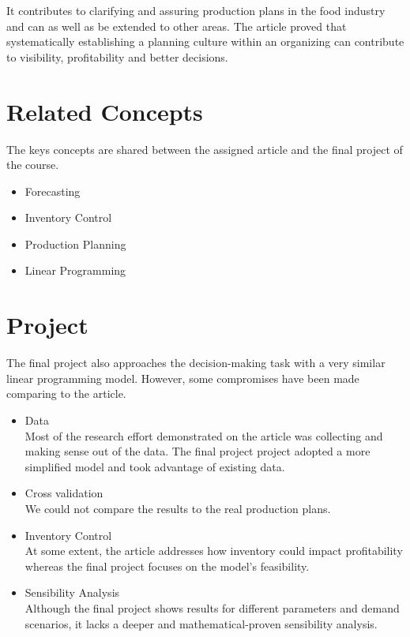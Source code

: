 \documentclass[a4paper,12pt]{article}
\begin{document}
It contributes to clarifying and assuring production plans in the food industry and can as well as be extended to other areas. The article proved
    that systematically establishing a planning culture within an organizing can contribute to visibility, profitability and better decisions. 
    
\section{Related Concepts}

The keys concepts are shared between the assigned article and the final project of the course.

\begin{itemize}
    \item Forecasting
    \item Inventory Control
    \item Production Planning
    \item Linear Programming
\end{itemize}

\section{Project}

The final project also approaches the decision-making task with a very similar linear programming model. However, some compromises have been made comparing to the article.

\begin{itemize}
    \item Data \\
        Most of the research effort demonstrated on the article was collecting and making sense out of the data. The final project project adopted a more simplified model and took advantage of existing data.
    \item  Cross validation \\
        We could not compare the results to the real production plans.
    \item Inventory Control \\
        At some extent, the article addresses how inventory could impact profitability whereas the final project focuses on the model's feasibility. 
    \item Sensibility Analysis \\
        Although the final project shows results for different parameters and demand scenarios, it lacks a deeper and mathematical-proven sensibility analysis.
\end{itemize}
\end{document}
